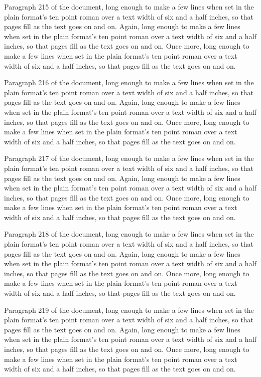 Paragraph 215 of the document, long enough to make a few lines when set in the plain format's ten point roman over a text width of six and a half inches, so that pages fill as the text goes on and on. Again, long enough to make a few lines when set in the plain format's ten point roman over a text width of six and a half inches, so that pages fill as the text goes on and on. Once more, long enough to make a few lines when set in the plain format's ten point roman over a text width of six and a half inches, so that pages fill as the text goes on and on.

Paragraph 216 of the document, long enough to make a few lines when set in the plain format's ten point roman over a text width of six and a half inches, so that pages fill as the text goes on and on. Again, long enough to make a few lines when set in the plain format's ten point roman over a text width of six and a half inches, so that pages fill as the text goes on and on. Once more, long enough to make a few lines when set in the plain format's ten point roman over a text width of six and a half inches, so that pages fill as the text goes on and on.

Paragraph 217 of the document, long enough to make a few lines when set in the plain format's ten point roman over a text width of six and a half inches, so that pages fill as the text goes on and on. Again, long enough to make a few lines when set in the plain format's ten point roman over a text width of six and a half inches, so that pages fill as the text goes on and on. Once more, long enough to make a few lines when set in the plain format's ten point roman over a text width of six and a half inches, so that pages fill as the text goes on and on.

Paragraph 218 of the document, long enough to make a few lines when set in the plain format's ten point roman over a text width of six and a half inches, so that pages fill as the text goes on and on. Again, long enough to make a few lines when set in the plain format's ten point roman over a text width of six and a half inches, so that pages fill as the text goes on and on. Once more, long enough to make a few lines when set in the plain format's ten point roman over a text width of six and a half inches, so that pages fill as the text goes on and on.

Paragraph 219 of the document, long enough to make a few lines when set in the plain format's ten point roman over a text width of six and a half inches, so that pages fill as the text goes on and on. Again, long enough to make a few lines when set in the plain format's ten point roman over a text width of six and a half inches, so that pages fill as the text goes on and on. Once more, long enough to make a few lines when set in the plain format's ten point roman over a text width of six and a half inches, so that pages fill as the text goes on and on.

